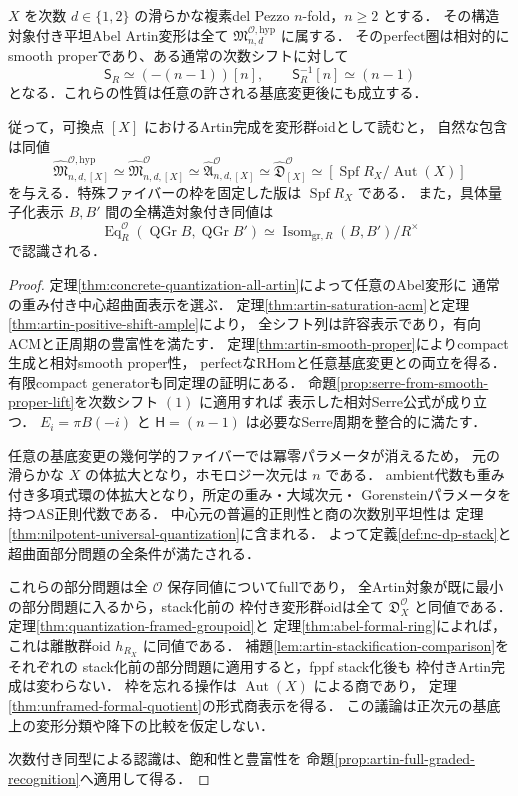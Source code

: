 \begin{theorem}
\label{thm:all-artin-are-nc-dp}
$X$ を次数 $d\in\{1,2\}$ の滑らかな複素del Pezzo $n$-fold，$n\ge2$ とする．
その構造対象付き平坦Abel Artin変形は全て
$\mathfrak M^{\mathcal O,\mathrm{hyp}}_{n,d}$ に属する．
そのperfect圏は相対的にsmooth properであり、ある通常の次数シフトに対して
\[
 \mathsf S_R\simeq (-(n-1))[n],\qquad
 \mathsf S_R^{-1}[n]\simeq(n-1)
\]
となる．これらの性質は任意の許される基底変更後にも成立する．

従って，可換点 $[X]$ におけるArtin完成を変形群oidとして読むと，
自然な包含は同値
\[
 \widehat{\mathfrak M}^{\mathcal O,\mathrm{hyp}}_{n,d,[X]}
 \simeq\widehat{\mathfrak M}^{\mathcal O}_{n,d,[X]}
 \simeq\widehat{\mathfrak A}^{\mathcal O}_{n,d,[X]}
 \simeq\widehat{\mathfrak D}^{\mathcal O}_{[X]}
 \simeq[\operatorname{Spf}R_X/\operatorname{Aut}(X)]
\]
を与える．特殊ファイバーの枠を固定した版は $\operatorname{Spf}R_X$ である．
また，具体量子化表示 $B,B'$ 間の全構造対象付き同値は
\[
 \operatorname{Eq}^{\mathcal O}_R(\operatorname{QGr}B,\operatorname{QGr}B')
 \simeq\operatorname{Isom}_{\mathrm{gr},R}(B,B')/R^\times
\]
で認識される．
\end{theorem}
\begin{proof}
定理\ref{thm:concrete-quantization-all-artin}によって任意のAbel変形に
通常の重み付き中心超曲面表示を選ぶ．
定理\ref{thm:artin-saturation-acm}と定理\ref{thm:artin-positive-shift-ample}により，
全シフト列は許容表示であり，有向ACMと正周期の豊富性を満たす．
定理\ref{thm:artin-smooth-proper}によりcompact生成と相対smooth proper性，
perfectなRHomと任意基底変更との両立を得る．有限compact generatorも同定理の証明にある．
命題\ref{prop:serre-from-smooth-proper-lift}を次数シフト $(1)$ に適用すれば
表示した相対Serre公式が成り立つ．
$E_i=\pi B(-i)$ と $\mathsf H=(n-1)$ は必要なSerre周期を整合的に満たす．

任意の基底変更の幾何学的ファイバーでは冪零パラメータが消えるため，
元の滑らかな $X$ の体拡大となり，ホモロジー次元は $n$ である．
ambient代数も重み付き多項式環の体拡大となり，所定の重み・大域次元・
Gorensteinパラメータを持つAS正則代数である．
中心元の普遍的正則性と商の次数別平坦性は
定理\ref{thm:nilpotent-universal-quantization}に含まれる．
よって定義\ref{def:nc-dp-stack}と超曲面部分問題の全条件が満たされる．

これらの部分問題は全 $\mathcal O$ 保存同値についてfullであり，
全Artin対象が既に最小の部分問題に入るから，stack化前の
枠付き変形群oidは全て $\mathfrak D_X^{\mathcal O}$ と同値である．
定理\ref{thm:quantization-framed-groupoid}と
定理\ref{thm:abel-formal-ring}によれば，これは離散群oid
$h_{R_X}$ に同値である．
補題\ref{lem:artin-stackification-comparison}をそれぞれの
stack化前の部分問題に適用すると，fppf stack化後も
枠付きArtin完成は変わらない．
枠を忘れる操作は $\operatorname{Aut}(X)$ による商であり，
定理\ref{thm:unframed-formal-quotient}の形式商表示を得る．
この議論は正次元の基底上の変形分類や降下の比較を仮定しない．

次数付き同型による認識は、飽和性と豊富性を
命題\ref{prop:artin-full-graded-recognition}へ適用して得る．
\end{proof}

